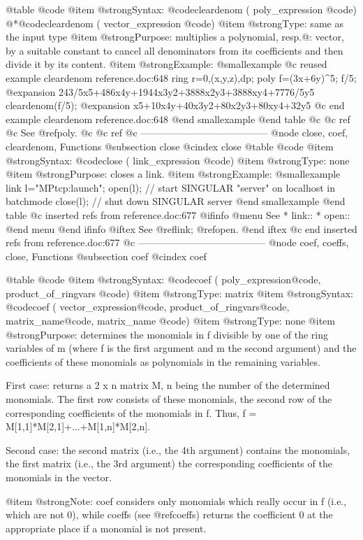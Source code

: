 @table @code
@item @strong{Syntax:}
@code{cleardenom (} poly_expression @code{)}
@*@code{cleardenom (} vector_expression @code{)}
@item @strong{Type:}
same as the input type
@item @strong{Purpose:}
multiplies a polynomial, resp.@: vector, by a suitable constant to cancel
all denominators from its coefficients and then divide it by its content.
@item @strong{Example:}
@smallexample
@c reused example cleardenom reference.doc:648 
  ring r=0,(x,y,z),dp;
  poly f=(3x+6y)^5;
  f/5;
@expansion{} 243/5x5+486x4y+1944x3y2+3888x2y3+3888xy4+7776/5y5
  cleardenom(f/5);
@expansion{} x5+10x4y+40x3y2+80x2y3+80xy4+32y5
@c end example cleardenom reference.doc:648
@end smallexample
@end table
@c @c ref
@c See @ref{poly}.
@c @c ref
@c ---------------------------------------
@node close, coef, cleardenom, Functions
@subsection close
@cindex close
@table @code
@item @strong{Syntax:}
@code{close (} link_expression @code{)}
@item @strong{Type:}
none
@item @strong{Purpose:}
closes a link.
@item @strong{Example:}
@smallexample
link l="MPtcp:launch";
open(l); // start SINGULAR "server" on localhost in batchmode
close(l); // shut down SINGULAR server
@end smallexample
@end table
@c inserted refs from reference.doc:677
@ifinfo
@menu
See
* link::
* open::
@end menu
@end ifinfo
@iftex
See
@ref{link};
@ref{open}.
@end iftex
@c end inserted refs from reference.doc:677
@c ---------------------------------------
@node coef, coeffs, close, Functions
@subsection coef
@cindex coef

@table @code
@item @strong{Syntax:}
@code{coef (} poly_expression@code{,} product_of_ringvars @code{)}
@item @strong{Type:}
matrix
@item @strong{Syntax:}
@code{coef (} vector_expression@code{,} product_of_ringvars@code{,} matrix_name@code{,} matrix_name @code{)}
@item @strong{Type:}
none
@item @strong{Purpose:}
determines the monomials in f divisible by one of the ring variables of m
(where f is the first argument and m the second argument) and the coefficients
of these monomials as polynomials in the remaining variables.

First case:  returns a 2 x n matrix M, n being the number
of the determined monomials.
The first row consists of these monomials, the second row
of the corresponding coefficients of the monomials in f.
Thus, f = M[1,1]*M[2,1]+...+M[1,n]*M[2,n].

Second case: the second matrix (i.e., the 4th argument) contains the
monomials, the first matrix (i.e., the 3rd argument) the corresponding
coefficients of the monomials in the vector.

@item @strong{Note:}
coef considers only monomials which really occur in f (i.e., which are not 0),
while coeffs (see @ref{coeffs}) returns the coefficient 0 at the
appropriate place if a monomial is not present.

